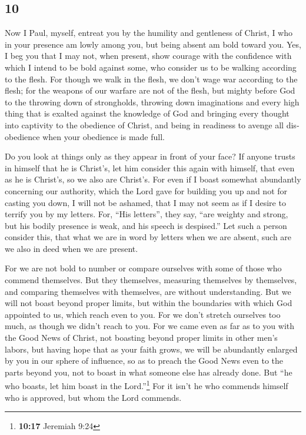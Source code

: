\begin{paracol}{2}
\switchcolumn
\begin{otherlanguage}{english}

\hypertarget{section-19}{%
\section{10}\label{section-19}}

 Now I Paul, myself, entreat you by the humility and
gentleness of Christ, I who in your presence am lowly among you, but
being absent am bold toward you.  Yes, I beg you that I
may not, when present, show courage with the confidence with which I
intend to be bold against some, who consider us to be walking according
to the flesh.  For though we walk in the flesh, we don't
wage war according to the flesh;  for the weapons of our
warfare are not of the flesh, but mighty before God to the throwing down
of strongholds,  throwing down imaginations and every high
thing that is exalted against the knowledge of God and bringing every
thought into captivity to the obedience of Christ,  and
being in readiness to avenge all disobedience when your obedience is
made full.

 Do you look at things only as they appear in front of
your face? If anyone trusts in himself that he is Christ's, let him
consider this again with himself, that even as he is Christ's, so we
also are Christ's.  For even if I boast somewhat
abundantly concerning our authority, which the Lord gave for building
you up and not for casting you down, I will not be ashamed,
 that I may not seem as if I desire to terrify you by my
letters.  For, ``His letters'', they say, ``are weighty
and strong, but his bodily presence is weak, and his speech is
despised.''  Let such a person consider this, that what
we are in word by letters when we are absent, such are we also in deed
when we are present.

 For we are not bold to number or compare ourselves with
some of those who commend themselves. But they themselves, measuring
themselves by themselves, and comparing themselves with themselves, are
without understanding.  But we will not boast beyond
proper limits, but within the boundaries with which God appointed to us,
which reach even to you.  For we don't stretch ourselves
too much, as though we didn't reach to you. For we came even as far as
to you with the Good News of Christ,  not boasting beyond
proper limits in other men's labors, but having hope that as your faith
grows, we will be abundantly enlarged by you in our sphere of influence,
 so as to preach the Good News even to the parts beyond
you, not to boast in what someone else has already done. 
But ``he who boasts, let him boast in the Lord.''\footnote{\textbf{10:17}
  Jeremiah 9:24}  For it isn't he who commends himself
who is approved, but whom the Lord commends.


\end{otherlanguage}
\end{paracol}
